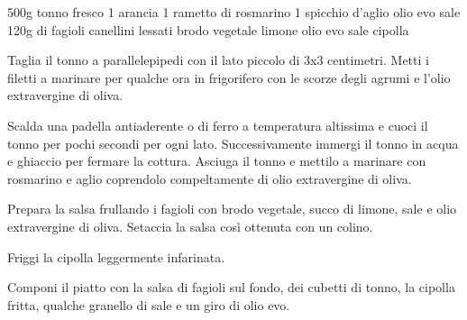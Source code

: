 \begin{ingreds}
	500g tonno fresco
	1 arancia
	1 rametto di rosmarino
	1 spicchio d'aglio
	olio evo
	sale
\columnbreak
{}
	120g di fagioli canellini lessati
	brodo vegetale
	limone
	olio evo
	sale
	cipolla
\end{ingreds}

\begin{method}

Taglia il tonno a parallelepipedi con il lato piccolo di 3x3 centimetri. Metti i filetti a marinare per qualche ora in frigorifero con le scorze degli agrumi e l'olio extravergine di oliva.

Scalda una padella antiaderente o di ferro a temperatura altissima e cuoci il tonno per pochi secondi per ogni lato. Successivamente immergi il tonno in acqua e ghiaccio per fermare la cottura. Asciuga il tonno e mettilo a marinare con rosmarino e aglio coprendolo compeltamente di olio extravergine di oliva.

Prepara la salsa frullando i fagioli con brodo vegetale, succo di limone, sale e olio extravergine di oliva. Setaccia la salsa così ottenuta con un colino.

Friggi la cipolla leggermente infarinata.

Componi il piatto con la salsa di fagioli sul fondo, dei cubetti di tonno, la cipolla fritta, qualche granello di sale e un giro di olio evo.
\end {method}
